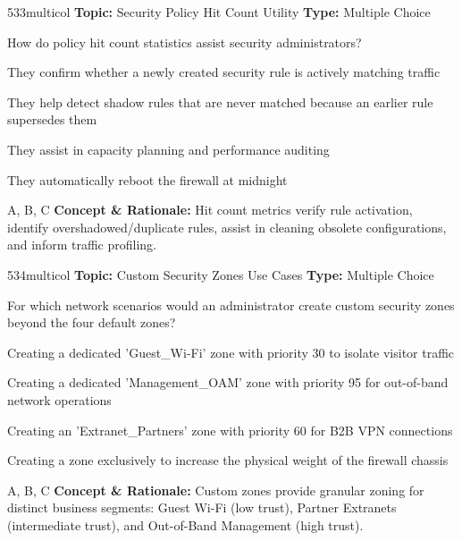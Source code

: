 \begin{qcard}{533}{multicol}
\textcolor{darkslate!75}{\small\textbf{Topic:} Security Policy Hit Count Utility \hfill \textbf{Type:} Multiple Choice}\vspace{0.4em}\par
How do policy hit count statistics assist security administrators?
\begin{qoptions}
\item They confirm whether a newly created security rule is actively matching traffic
\item They help detect shadow rules that are never matched because an earlier rule supersedes them
\item They assist in capacity planning and performance auditing
\item They automatically reboot the firewall at midnight
\end{qoptions}
\end{qcard}
\nopagebreak
\begin{explainbox}{A, B, C}
\textbf{Concept \& Rationale:} Hit count metrics verify rule activation, identify overshadowed/duplicate rules, assist in cleaning obsolete configurations, and inform traffic profiling.
\end{explainbox}

\begin{qcard}{534}{multicol}
\textcolor{darkslate!75}{\small\textbf{Topic:} Custom Security Zones Use Cases \hfill \textbf{Type:} Multiple Choice}\vspace{0.4em}\par
For which network scenarios would an administrator create custom security zones beyond the four default zones?
\begin{qoptions}
\item Creating a dedicated 'Guest\_Wi-Fi' zone with priority 30 to isolate visitor traffic
\item Creating a dedicated 'Management\_OAM' zone with priority 95 for out-of-band network operations
\item Creating an 'Extranet\_Partners' zone with priority 60 for B2B VPN connections
\item Creating a zone exclusively to increase the physical weight of the firewall chassis
\end{qoptions}
\end{qcard}
\nopagebreak
\begin{explainbox}{A, B, C}
\textbf{Concept \& Rationale:} Custom zones provide granular zoning for distinct business segments: Guest Wi-Fi (low trust), Partner Extranets (intermediate trust), and Out-of-Band Management (high trust).
\end{explainbox}

